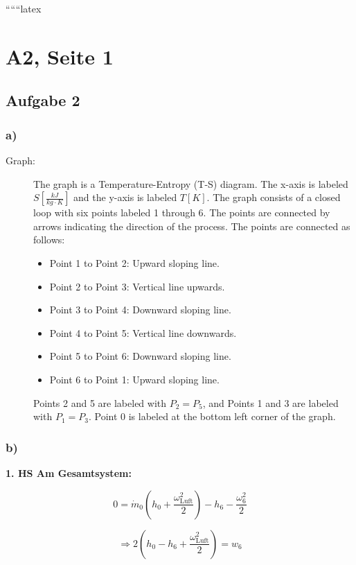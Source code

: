 
``````latex


\section*{A2, Seite 1}

\subsection*{Aufgabe 2}

\subsubsection*{a)}

\begin{description}
    \item[Graph:] The graph is a Temperature-Entropy (T-S) diagram. The x-axis is labeled $S \left[ \frac{kJ}{kg \cdot K} \right]$ and the y-axis is labeled $T \left[ K \right]$. The graph consists of a closed loop with six points labeled 1 through 6. The points are connected by arrows indicating the direction of the process. The points are connected as follows:
    \begin{itemize}
        \item Point 1 to Point 2: Upward sloping line.
        \item Point 2 to Point 3: Vertical line upwards.
        \item Point 3 to Point 4: Downward sloping line.
        \item Point 4 to Point 5: Vertical line downwards.
        \item Point 5 to Point 6: Downward sloping line.
        \item Point 6 to Point 1: Upward sloping line.
    \end{itemize}
    Points 2 and 5 are labeled with $P_2 = P_5$, and Points 1 and 3 are labeled with $P_1 = P_3$. Point 0 is labeled at the bottom left corner of the graph.
\end{description}

\subsubsection*{b)}

\textbf{1. HS Am Gesamtsystem:}

\[
0 = \dot{m}_0 \left( h_0 + \frac{\omega_{\text{Luft}}^2}{2} \right) - h_6 - \frac{\omega_6^2}{2}
\]

\[
\Rightarrow 2 \left( h_0 - h_6 + \frac{\omega_{\text{Luft}}^2}{2} \right) = w_6
\]


